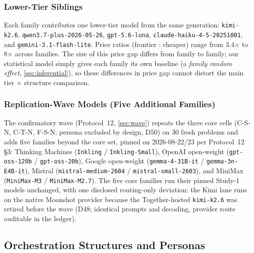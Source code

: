 \documentclass[12pt,a4paper]{article}
\begin{document}
\subsubsection{Lower-Tier Siblings}

\begin{sloppypar}
Each family contributes one lower-tier model from the same generation:
\texttt{kimi-k2.6}, \texttt{qwen3.7-plus-2026-05-26}, \texttt{gpt-5.6-luna},
\texttt{claude-haiku-4-5-20251001}, and \texttt{gemini-3.1-flash-lite}. Price
ratios (frontier : cheaper) range from 3.4$\times$ to 8$\times$ across families.
The size of this price gap differs from family to family; our statistical model
simply gives each family its own baseline (a \emph{family random effect},
\cref{sec:inferential}), so these differences in price gap cannot distort the
main tier $\times$ structure comparison.
\end{sloppypar}

\subsubsection{Replication-Wave Models (Five Additional Families)}

The confirmatory wave (Protocol~12, \cref{sec:wave}) repeats the three core
cells (C-S-N, C-T-N, F-S-N; persona excluded by design, D50) on 30 fresh
problems and adds five families beyond the core set, pinned on
2026-08-22/23 per Protocol~12 \S3: Thinking Machines
(\texttt{Inkling} / \texttt{Inkling-Small}), OpenAI open-weight
(\texttt{gpt-oss-120b} / \texttt{gpt-oss-20b}), Google open-weight
(\texttt{gemma-4-31B-it} / \texttt{gemma-3n-E4B-it}), Mistral
(\texttt{mistral-medium-2604} / \texttt{mistral-small-2603}), and MiniMax
(\texttt{MiniMax-M3} / \texttt{MiniMax-M2.7}). The five core families run their
pinned Study-1 models unchanged, with one disclosed routing-only deviation:
the Kimi lane runs on the native Moonshot provider because the Together-hosted
\texttt{kimi-k2.6} was retired before the wave (D48; identical prompts and
decoding, provider route auditable in the ledger).

\subsection{Orchestration Structures and Personas}
\end{document}
